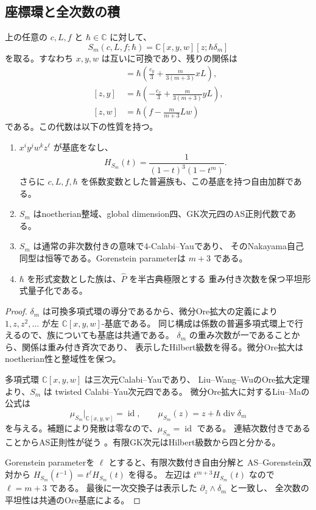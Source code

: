 \subsection{座標環と全次数の積}

\begin{theorem}[全重みに対する微分Ore族]
\label{thm:pullback-ore-v33}
上の任意の $c,L,f$ と $\hbar\in\mathbb C$ に対して、
\[
 S_m(c,L,f;\hbar)=\mathbb C[x,y,w][z;\hbar\delta_m]
\]
を取る。すなわち $x,y,w$ は互いに可換であり、残りの関係は
\begin{align*}
 [z,x]&=\hbar\left(\frac{c_y}{3}+\frac{m}{3(m+3)}xL\right),\\
 [z,y]&=\hbar\left(-\frac{c_x}{3}+\frac{m}{3(m+3)}yL\right),\\
 [z,w]&=\hbar\left(f-\frac{m}{m+3}Lw\right)
\end{align*}
である。この代数は以下の性質を持つ。
\begin{enumerate}[label=\textup{(\roman*)}]
\item $x^iy^jw^kz^\ell$ が基底をなし、
\[
 H_{S_m}(t)=\frac1{(1-t)^3(1-t^m)}.
\]
さらに $c,L,f,\hbar$ を係数変数とした普遍族も、この基底を持つ自由加群である。
\item $S_m$ はnoetherian整域、global dimension四、GK次元四のAS正則代数である。
\item $S_m$ は通常の非次数付きの意味で4-Calabi--Yauであり、
そのNakayama自己同型は恒等である。Gorenstein parameterは $m+3$ である。
\item $\hbar$ を形式変数とした族は、$\widehat P$ を半古典極限とする
重み付き次数を保つ平坦形式量子化である。
\end{enumerate}
\end{theorem}

\begin{proof}
$\delta_m$ は可換多項式環の導分であるから、微分Ore拡大の定義により
$1,z,z^2,\ldots$ が左 $\mathbb C[x,y,w]$-基底である。
同じ構成は係数の普遍多項式環上で行えるので、族についても基底は共通である。
$\delta_m$ の重み次数が一であることから、関係は重み付き斉次であり、
表示したHilbert級数を得る。微分Ore拡大はnoetherian性と整域性を保つ。

多項式環 $\mathbb C[x,y,w]$ は三次元Calabi--Yauであり、
Liu--Wang--WuのOre拡大定理\cite[Theorem 3.3]{LWW}より、$S_m$ は
twisted Calabi--Yau次元四である。
微分Ore拡大に対するLiu--Maの公式\cite[Theorem 4.2]{LiuMa2020}は
\[
 \mu_{S_m}|_{\mathbb C[x,y,w]}=\operatorname{id},\qquad
 \mu_{S_m}(z)=z+\hbar\operatorname{div}\delta_m
\]
を与える。補題により発散は零なので、$\mu_{S_m}=\operatorname{id}$ である。
連結次数付きであることからAS正則性が従う
\cite[Lemma 1.3]{LWW}。有限GK次元はHilbert級数から四と分かる。

Gorenstein parameterを $\ell$ とすると、有限次数付き自由分解と
AS--Gorenstein双対から
$H_{S_m}(t^{-1})=t^\ell H_{S_m}(t)$ を得る。
左辺は $t^{m+3}H_{S_m}(t)$ なので $\ell=m+3$ である。
最後に一次交換子は表示した $\partial_z\wedge\delta_m$ と一致し、
全次数の平坦性は共通のOre基底による。
\end{proof}

